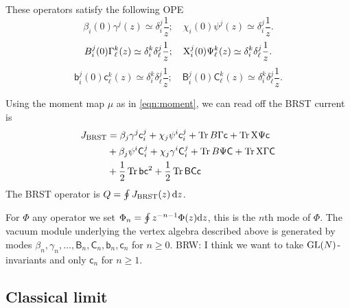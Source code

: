 \documentclass[11pt]{amsart}
\def\GL{{\rm GL}}
\def\sfc{{\mathsf{c}}}
\def\sfb{{\mathsf{b}}}
\def\sfB{{\mathsf{B}}}
\def\sfC{{\mathsf{C}}}
\renewcommand{\op}{\operatorname}
\def\brian#1{{\textcolor{blue!65!red}{BRW: {#1}}}}
\begin{document}
These operators satisfy the following OPE
\[
\beta_i (0) \gamma^j (z) \simeq \delta_i^j \frac1z ; \quad \chi_i (0) \psi^j (z) \simeq \delta^j_i \frac1z  .
\]
\[
B_i^j (0) \Gamma^k_\ell (z) \simeq \delta_i^k \delta_\ell^j \frac1z ; \quad {\rm X}_i^j (0) \Psi^k_\ell (z) \simeq \delta_i^k \delta_\ell^j \frac1z  .
\]
\[
\sfb_i^j (0) \sfc^k_\ell (z) \simeq \delta_i^k \delta_\ell^j \frac1z ; \quad \sfB_i^j (0) \sfC^k_\ell (z) \simeq \delta_i^k \delta_\ell^j \frac1z  .
\]

Using the moment map $\mu$ as in \eqref{eqn:moment}, we can read off the BRST current is
\begin{align*}
J_{\rm BRST} & = \beta_j  \gamma^j \sfc_i^j + \chi_j  \psi^i \sfc_i^j + \op{Tr} B \Gamma \sfc + \op{Tr}  {\rm X}\Psi \sfc \\
& + \beta_j  \psi^i \sfC_i^j + \chi_j \gamma^i \sfC_i^j  + \op{Tr} B \Psi \sfC + \op{Tr} {\rm X} \Gamma \sfC  \\
& + \frac12 \op{Tr} \sfb \sfc^2 + \frac12 \op{Tr} \sfB  \sfC \sfc
\end{align*}
The BRST operator is $Q = \oint J_{\rm BRST} (z)\, {\rm d} z$.

For $\Phi$ any operator we set $\Phi_n = \oint z^{-n-1} \Phi(z) {\rm d} z$, this is the $n$th mode of $\Phi$.
The vacuum module underlying the vertex algebra described above is generated by modes $\beta_n, \gamma_n, \ldots, \sfB_n, \sfC_n, \sfb_n, \sfc_n$ for $n \geq 0$. 
\brian{I think we want to take $\GL(N)$-invariants and only $\sfc_n$ for $n \geq 1$.}



\subsection{Classical limit}
\end{document}
